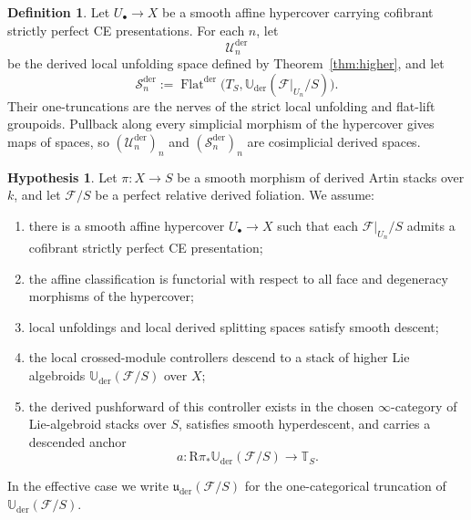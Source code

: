 \documentclass[11pt,reqno,a4paper,dvipsnames,x11names]{amsart}
\numberwithin{equation}{section}
\theoremstyle{plain}
\theoremstyle{definition}
\newtheorem{definition}[theorem]{Definition}
\newtheorem{hypothesis}[theorem]{Hypothesis}
\theoremstyle{remark}
\newcommand{\kk}{k}
\newcommand{\cF}{\mathcal F}
\newcommand{\uuder}{\mathfrak u_{\mathrm{der}}}
\newcommand{\Uder}{\mathbb U_{\mathrm{der}}}
\newcommand{\bbT}{\mathbb T}
\newcommand{\from}{\colon}
\begin{document}
\begin{definition}\label{def:local-groupoids}
Let \(U_\bullet\to X\) be a smooth affine hypercover carrying cofibrant strictly perfect CE presentations. For each \(n\), let
\[
 \mathcal U_n^{\mathrm{der}}
\]
be the derived local unfolding space defined by Theorem~\ref{thm:higher}, and let
\[
 \mathcal S_n^{\mathrm{der}}
 :=\operatorname{Flat}^{\mathrm{der}}
 \bigl(T_S,\Uder(\cF|_{U_n}/S)\bigr).
\]
Their one-truncations are the nerves of the strict local unfolding and flat-lift groupoids. Pullback along every simplicial morphism of the hypercover gives maps of spaces, so
\((\mathcal U_n^{\mathrm{der}})_n\) and
\((\mathcal S_n^{\mathrm{der}})_n\) are cosimplicial derived spaces.
\end{definition}

\begin{hypothesis}\label{hyp:global-descent}
Let \(\pi\from X\to S\) be a smooth morphism of derived Artin stacks over \(\kk\), and let \(\cF/S\) be a perfect relative derived foliation. We assume:
\begin{enumerate}[label=(\roman*)]
\item there is a smooth affine hypercover \(U_\bullet\to X\) such that each \(\cF|_{U_n}/S\) admits a cofibrant strictly perfect CE presentation;
\item the affine classification is functorial with respect to all face and degeneracy morphisms of the hypercover;
\item local unfoldings and local derived splitting spaces satisfy smooth descent;
\item the local crossed-module controllers descend to a stack of higher Lie algebroids \(\Uder(\cF/S)\) over \(X\);
\item the derived pushforward of this controller exists in the chosen \(\infty\)-category of Lie-algebroid stacks over \(S\), satisfies smooth hyperdescent, and carries a descended anchor
\[
 a\from \mathrm R\pi_*\Uder(\cF/S)\longrightarrow \bbT_S.
\]
\end{enumerate}
In the effective case we write \(\uuder(\cF/S)\) for the one-categorical truncation of \(\Uder(\cF/S)\).
\end{hypothesis}
\end{document}
